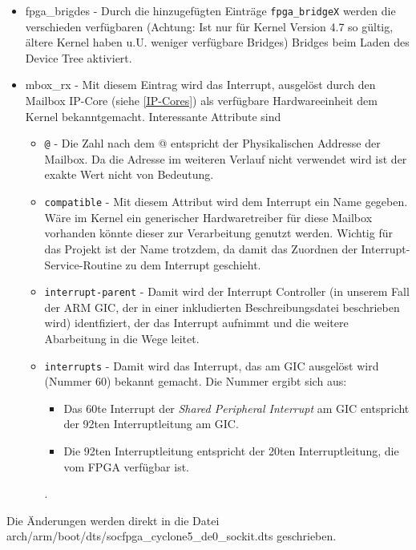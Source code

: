 \begin{itemize}
	\item fpga\_brigdes - Durch die hinzugefügten Einträge \texttt{fpga\_bridgeX} werden die verschieden verfügbaren (Achtung: Ist nur für Kernel Version 4.7 so gültig, ältere Kernel haben u.U. weniger verfügbare Bridges) Bridges beim Laden des Device Tree aktiviert.
	\item mbox\_rx - Mit diesem Eintrag wird das Interrupt, ausgelöst durch den Mailbox \ac{IP}-Core (siehe \ref{IP-Cores}) als verfügbare Hardwareeinheit dem Kernel bekanntgemacht. Interessante Attribute sind
	\begin{itemize}
		\item \texttt{@} - Die Zahl nach dem @ entspricht der Physikalischen Addresse der Mailbox. Da die Adresse im weiteren Verlauf nicht verwendet wird ist der exakte Wert nicht von Bedeutung.
		\item \texttt{compatible} - Mit diesem Attribut wird dem Interrupt ein Name gegeben. Wäre im Kernel ein generischer Hardwaretreiber für diese Mailbox vorhanden könnte dieser zur Verarbeitung genutzt werden. Wichtig für das Projekt ist der Name trotzdem, da damit das Zuordnen der Interrupt-Service-Routine zu dem Interrupt geschieht.
		\item \texttt{interrupt-parent} - Damit wird der Interrupt Controller (in unserem Fall der ARM GIC, der in einer inkludierten Beschreibungsdatei beschrieben wird) identfiziert, der das Interrupt aufnimmt und die weitere Abarbeitung in die Wege leitet.
		\item \texttt{interrupts} - Damit wird das Interrupt, das am GIC ausgelöst wird (Nummer 60) bekannt gemacht. Die Nummer ergibt sich aus:
		\begin{itemize}
			\item Das 60te Interrupt der \textit{Shared Peripheral Interrupt} am GIC entspricht der 92ten Interruptleitung am GIC.
			\item Die 92ten Interruptleitung entspricht der 20ten Interruptleitung, die vom \ac{FPGA} verfügbar ist.
		\end{itemize}
		\cite{interrupts_linux}.
	\end{itemize}
\end{itemize}
Die Änderungen werden direkt in die Datei arch/arm/boot/dts/socfpga\_cyclone5\_de0\_sockit.dts geschrieben.

